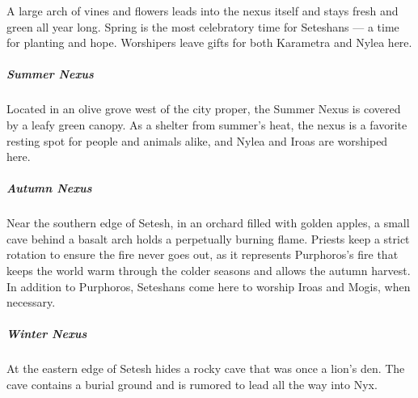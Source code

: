         \newpage


        \vspace{12.5cm}

        A large arch of vines and flowers leads into the nexus itself and stays fresh and green all year long.
        Spring is the most celebratory time for Seteshans --- a time for planting and hope.
        Worshipers leave gifts for both Karametra and Nylea here.

        \subparagraph{Summer Nexus} Located in an olive grove west of the city proper, the Summer Nexus is covered by a leafy green canopy.
        As a shelter from summer's heat, the nexus is a favorite resting spot for people and animals alike, and Nylea and Iroas are worshiped here.

        \subparagraph{Autumn Nexus} Near the southern edge of Setesh, in an orchard filled with golden apples, a small cave behind a basalt arch holds a perpetually burning flame.
        Priests keep a strict rotation to ensure the fire never goes out, as it represents Purphoros's fire that keeps the world warm through the colder seasons and allows the autumn harvest.
        In addition to Purphoros, Seteshans come here to worship Iroas and Mogis, when necessary.

        \subparagraph{Winter Nexus} At the eastern edge of Setesh hides a rocky cave that was once a lion's den.
        The cave contains a burial ground and is rumored to lead all the way into Nyx.

